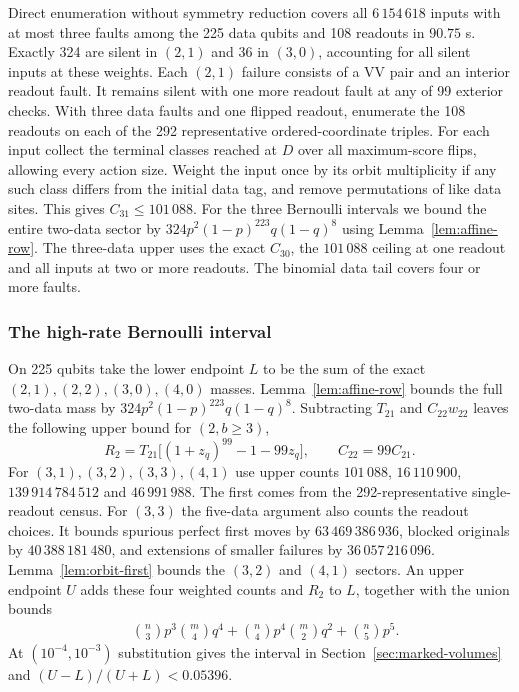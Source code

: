 \documentclass[10pt,twocolumn]{article}
\theoremstyle{definition}
\begin{document}
Direct enumeration without symmetry reduction covers all
$6\,154\,618$ inputs with at most three faults among the 225 data
qubits and 108 readouts in $90.75$ s. Exactly 324 are silent in
$(2,1)$ and 36 in $(3,0)$, accounting for all silent inputs at
these weights. Each $(2,1)$ failure consists of a VV pair and an
interior readout fault. It remains silent with one more readout
fault at any of 99 exterior checks. With three data faults and one
flipped readout, enumerate the 108 readouts on each of the 292
representative ordered-coordinate triples. For each input collect the
terminal classes reached at $D$ over all maximum-score flips, allowing
every action size. Weight the input once by its orbit multiplicity if
any such class differs from the initial data tag, and remove permutations
of like data sites. This gives $C_{31}\le101\,088$. For the three Bernoulli intervals we bound the entire
two-data sector by $324p^2(1-p)^{223}q(1-q)^8$ using
Lemma~\ref{lem:affine-row}. The three-data upper uses the exact
$C_{30}$, the $101\,088$ ceiling at one readout and all inputs at
two or more readouts. The binomial data tail covers four or more faults.

\subsubsection{The high-rate Bernoulli interval}\label{app:high-rate-225}
On 225 qubits take the lower endpoint $L$ to be the sum of the exact
$(2,1),(2,2),(3,0),(4,0)$ masses. Lemma~\ref{lem:affine-row} bounds
the full two-data mass by $324p^2(1-p)^{223}q(1-q)^8$.
Subtracting $T_{21}$ and $C_{22}w_{22}$ leaves the following upper
bound for $(2,b\ge3)$,
\[
 R_2=T_{21}\big[(1+z_q)^{99}-1-99z_q\big],
 \qquad C_{22}=99C_{21}.
\]
For $(3,1),(3,2),(3,3),(4,1)$ use upper counts $101\,088$,
$16\,110\,900$, $139\,914\,784\,512$ and $46\,991\,988$.
The first comes from the 292-representative single-readout census.
For $(3,3)$ the five-data argument also counts the readout choices.
It bounds spurious perfect first moves by $63\,469\,386\,936$, blocked
originals by $40\,388\,181\,480$, and extensions of smaller failures
by $36\,057\,216\,096$. Lemma~\ref{lem:orbit-first} bounds the
$(3,2)$ and $(4,1)$ sectors.
An upper endpoint $U$ adds these four weighted counts and $R_2$ to
$L$, together with the union bounds
\begin{align*}
 &\binom n3 p^3\binom m4 q^4+
   \binom n4 p^4\binom m2 q^2+\binom n5 p^5 .
\end{align*}
At $(10^{-4},10^{-3})$ substitution gives the interval in
Section~\ref{sec:marked-volumes} and $(U-L)/(U+L)<0.05396$.
\end{document}

